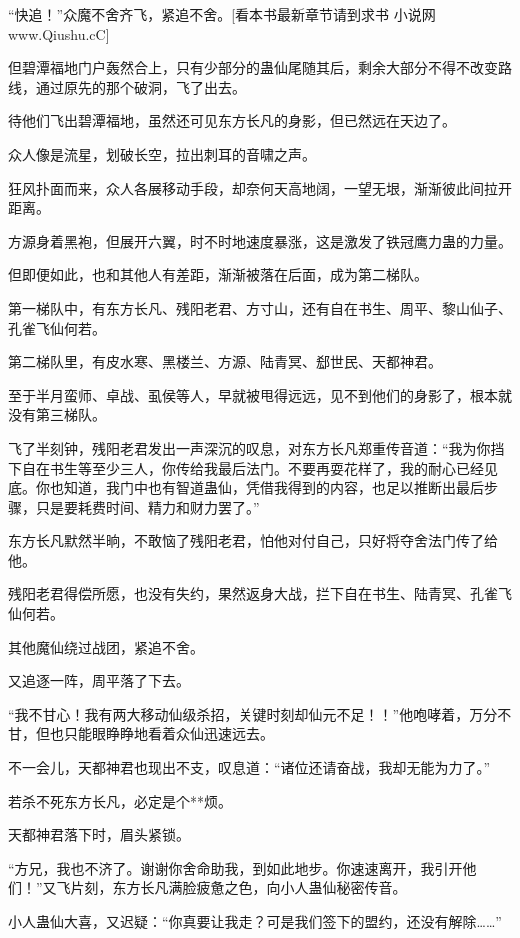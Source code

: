 
\begin{this_body}

“快追！”众魔不舍齐飞，紧追不舍。[看本书最新章节请到求书 小说网www.Qiushu.cC]

但碧潭福地门户轰然合上，只有少部分的蛊仙尾随其后，剩余大部分不得不改变路线，通过原先的那个破洞，飞了出去。

待他们飞出碧潭福地，虽然还可见东方长凡的身影，但已然远在天边了。

众人像是流星，划破长空，拉出刺耳的音啸之声。

狂风扑面而来，众人各展移动手段，却奈何天高地阔，一望无垠，渐渐彼此间拉开距离。

方源身着黑袍，但展开六翼，时不时地速度暴涨，这是激发了铁冠鹰力蛊的力量。

但即便如此，也和其他人有差距，渐渐被落在后面，成为第二梯队。

第一梯队中，有东方长凡、残阳老君、方寸山，还有自在书生、周平、黎山仙子、孔雀飞仙何若。

第二梯队里，有皮水寒、黑楼兰、方源、陆青冥、郄世民、天都神君。

至于半月蛮师、卓战、虱侯等人，早就被甩得远远，见不到他们的身影了，根本就没有第三梯队。

飞了半刻钟，残阳老君发出一声深沉的叹息，对东方长凡郑重传音道：“我为你挡下自在书生等至少三人，你传给我最后法门。不要再耍花样了，我的耐心已经见底。你也知道，我门中也有智道蛊仙，凭借我得到的内容，也足以推断出最后步骤，只是要耗费时间、精力和财力罢了。”

东方长凡默然半晌，不敢恼了残阳老君，怕他对付自己，只好将夺舍法门传了给他。

残阳老君得偿所愿，也没有失约，果然返身大战，拦下自在书生、陆青冥、孔雀飞仙何若。

其他魔仙绕过战团，紧追不舍。

又追逐一阵，周平落了下去。

“我不甘心！我有两大移动仙级杀招，关键时刻却仙元不足！！”他咆哮着，万分不甘，但也只能眼睁睁地看着众仙迅速远去。

不一会儿，天都神君也现出不支，叹息道：“诸位还请奋战，我却无能为力了。”

若杀不死东方长凡，必定是个**烦。

天都神君落下时，眉头紧锁。

“方兄，我也不济了。谢谢你舍命助我，到如此地步。你速速离开，我引开他们！”又飞片刻，东方长凡满脸疲惫之色，向小人蛊仙秘密传音。

小人蛊仙大喜，又迟疑：“你真要让我走？可是我们签下的盟约，还没有解除……”


\end{this_body}
